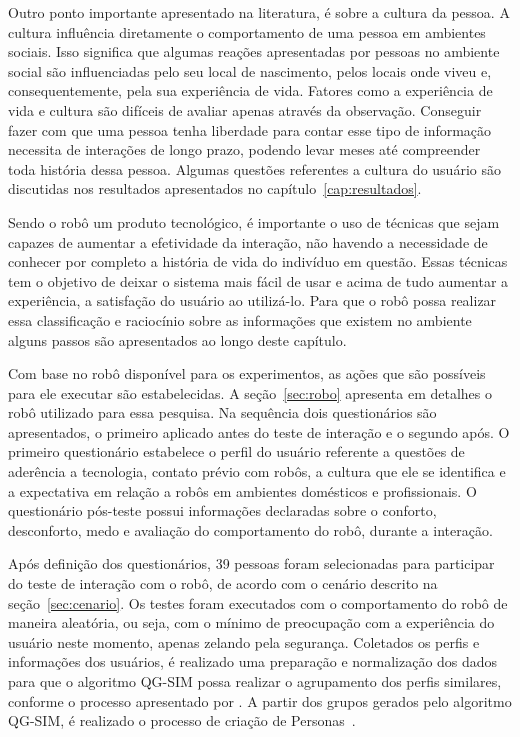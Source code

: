 Outro ponto importante apresentado na literatura, é sobre a cultura da pessoa. A cultura influência diretamente o comportamento de uma pessoa em ambientes sociais. Isso significa que algumas reações apresentadas por pessoas no ambiente social são influenciadas pelo seu local de nascimento, pelos locais onde viveu e, consequentemente, pela sua experiência de vida. Fatores como a experiência de vida e cultura são difíceis de avaliar apenas através da observação. Conseguir fazer com que uma pessoa tenha liberdade para contar esse tipo de informação necessita de interações de longo prazo, podendo levar meses até compreender toda história dessa pessoa. Algumas questões referentes a cultura do usuário são discutidas nos resultados apresentados no capítulo~\ref{cap:resultados}.

Sendo o robô um produto tecnológico, é importante o uso de técnicas que sejam capazes de aumentar a efetividade da interação, não havendo a necessidade de conhecer por completo a história de vida do indivíduo em questão. Essas técnicas tem o objetivo de deixar o sistema mais fácil de usar e acima de tudo aumentar a experiência, a satisfação do usuário ao utilizá-lo. Para que o robô possa realizar essa classificação e raciocínio sobre as informações que existem no ambiente alguns passos são apresentados ao longo deste capítulo.

Com base no robô disponível para os experimentos, as ações que são possíveis para ele executar são estabelecidas. A seção~\ref{sec:robo} apresenta em detalhes o robô utilizado para essa pesquisa. Na sequência dois questionários são apresentados, o primeiro aplicado antes do teste de interação e o segundo após. O primeiro questionário estabelece o perfil do usuário referente a questões de aderência a tecnologia, contato prévio com robôs, a cultura que ele se identifica e a expectativa em relação a robôs em ambientes domésticos e profissionais. O questionário pós-teste possui informações declaradas sobre o conforto, desconforto, medo e avaliação do comportamento do robô, durante a interação.

Após definição dos questionários, 39 pessoas foram selecionadas para participar do teste de interação com o robô, de acordo com o cenário descrito na seção~\ref{sec:cenario}. Os testes foram executados com o comportamento do robô de maneira aleatória, ou seja, com o mínimo de preocupação com a experiência do usuário neste momento, apenas zelando pela segurança. Coletados os perfis e informações dos usuários, é realizado uma preparação e normalização dos dados para que o algoritmo QG-SIM possa realizar o agrupamento dos perfis similares, conforme o processo apresentado por . A partir dos grupos gerados pelo algoritmo QG-SIM, é realizado o processo de criação de Personas~\cite{masiero:2013, masiero:2013b}.

